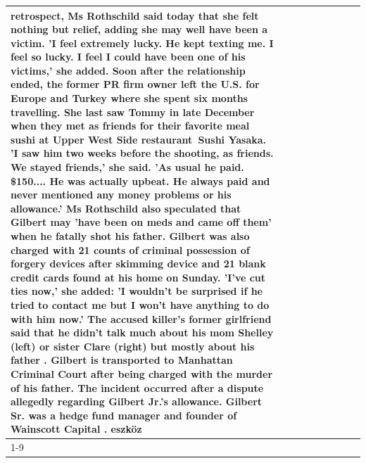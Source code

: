 \begin{table}[H]
\begin{tabular}{lllrlllll}
retrospect, Ms Rothschild said today that she felt nothing but relief, adding she may well have been a victim. 'I feel extremely lucky. He kept texting me. I feel so lucky. I feel I could have been one of his victims,' she added. Soon after the relationship ended, the former PR firm owner left the U.S. for Europe and Turkey where she spent six months  travelling. She last saw Tommy in late December when they met as friends for their favorite meal sushi at Upper West Side restaurant Sushi Yasaka. 'I saw him two weeks before the shooting, as friends. We stayed friends,' she said. 'As usual he paid. \$150.... He was actually upbeat. He always paid and never mentioned any money problems or his allowance.' Ms Rothschild also speculated that Gilbert may 'have been on meds and came off them' when he fatally shot his father. Gilbert was also charged with 21 counts of criminal possession of forgery devices after skimming device and 21 blank credit cards found at his home on Sunday. 'I've cut ties now,' she added: 'I wouldn’t be surprised if he tried to contact me but I won’t have anything to do with him now.' The accused killer's former girlfriend said that he didn't talk much about his mom Shelley (left) or sister Clare (right) but mostly about his father . Gilbert is transported to Manhattan Criminal Court  after being charged with the murder of his father. The incident occurred after a dispute allegedly regarding Gilbert Jr.'s allowance. Gilbert Sr. was a hedge fund manager and founder of Wainscott Capital . eszköz \\
\cline{1-9} \cline{2-9}

\end{tabular}
\end{table}
